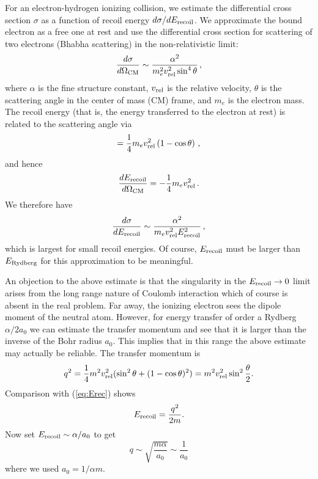 \documentclass[iop,numberedappendix,apj]{emulateapj}
\begin{document}
For an electron-hydrogen ionizing collision, we estimate the differential cross section $\sigma$ as a function of recoil energy $d\sigma / dE_{\rm recoil}$.
We approximate the bound electron as a free one at rest and use the differential cross section for scattering of two electrons (Bhabha scattering) in the non-relativistic limit:
\begin{equation}
\label{eq:dsig/dOmeg} \frac{d\sigma}{d\Omega_{\rm CM}} \sim \frac{\alpha^2}{m_e^2 v_{\rm rel}^2 \sin^4 \theta} \, ,
\end{equation}
where $\alpha$ is the fine structure constant, $v_{\rm rel}$ is the relative velocity, $\theta$ is the scattering angle in the center of mass (CM) frame, and $m_e$ is the electron mass.
The recoil energy (that is, the energy transferred to the electron at rest) is related to the scattering angle via
\begin{equation}
  \label{eq:Erec} = \frac{1}{4} m_e v_{\rm rel}^2 \left( 1 - \cos \theta \right) \, ,
\end{equation}
and hence
\begin{equation}
  \label{eq:dErec/dOmeg} \frac{dE_{\rm recoil}}{d\Omega_{\rm CM}} = -\frac{1}{4} m_e v_{\rm rel}^2 \, .
\end{equation}
We therefore have
\begin{equation}
  \label{eq:dsig/dErec} \frac{d\sigma}{dE_{\rm recoil}} \sim \frac{\alpha^2}{m_e v_{\rm rel}^2 E_{\rm recoil}^2} \, ,
\end{equation}
which is largest for small recoil energies.
Of course, $E_{\rm recoil}$ must be larger than $E_{\rm Rydberg}$ for this approximation to be meaningful. 

An objection to the above estimate is that the singularity in the $E_{\rm recoil} \rightarrow 0$ limit arises from the long range nature of Coulomb interaction which of course is absent in the real problem.
Far away, the ionizing electron sees the dipole moment of the neutral atom.
However, for energy transfer of order a Rydberg $\alpha/2a_0$ we can estimate the transfer momentum and see that it is larger than the inverse of the Bohr radius $a_0$.
This implies that in this range the above estimate may actually be reliable. The transfer momentum is
\begin{equation}
q^2 =\frac{1}{4} m^2 v_{\rm rel}^2 (\sin^2\theta +(1-\cos \theta)^2)= m^2v_{\rm rel}^2 \sin^2 \frac{\theta}{2}.
\end{equation}
Comparison with (\ref{eq:Erec}) shows
\begin{equation}
E_{\rm recoil} = \frac{q^2}{2m}.
\end{equation}
Now set $E_{\rm recoil} \sim \alpha/a_0$ to get
\begin{equation}
q \sim \sqrt{\frac{m\alpha}{a_0}}\sim \frac{1}{a_0}
\end{equation}
where we used $a_0 = 1/\alpha m$.
\end{document}
